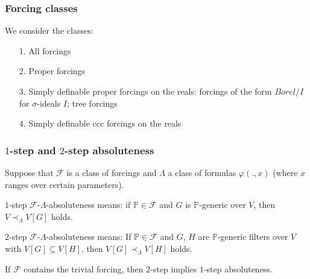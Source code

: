 \documentclass[handout, dvipsnames, usenames, 9pt, serif]{beamer}
\newcommand{\PP}{\mathbb{P}}
\newcommand{\QQ}{\mathbb{Q}}
\newcommand{\FF}{\mathcal{F}}
\newcommand{\cb}{\color{blue}}
\begin{document}
\begin{frame}
\frametitle{Forcing classes} 

We consider the classes: 

\begin{enumerate} 
\item[1.] 
All forcings 
\item[2.] 
{\cb Proper} forcings 
\item[3.] 
Simply definable proper forcings on the reals: forcings of the form {\cb $Borel/I$} for $\sigma$-ideals $I$; tree forcings 
\item[4.] 
Simply definable {\cb ccc} forcings on the reals 
\end{enumerate} 


\end{frame}



\begin{frame}
\frametitle{$1$-step and $2$-step absoluteness} 


Suppose that $\FF$ is a class of forcings and $\Lambda$ a class of formulas $\varphi(.,x)$ (where $x$ ranges over certain parameters). 

\begin{definition} 
{\cb $1$-step $\FF$-$\Lambda$-absoluteness} means: if $\PP\in\FF$ and $G$ is $\PP$-generic over $V$, then {\cb $V\prec_\Lambda V[G]$} holds. 
\end{definition} 
\pause  

\begin{definition} 
{\cb $2$-step $\FF$-$\Lambda$-absoluteness} means: 
If $\PP\in\FF$ and $G$, $H$ are $\PP$-generic filters over $V$ with $V[G]\subseteq V[H]$, then 
{\cb $V[G]\prec_\Lambda V[H]$} holds. 
\end{definition} 
\pause 

\medskip 
If $\FF$ contains the trivial forcing, then $2$-step implies $1$-step absoluteness. 
\end{frame}
\end{document}
